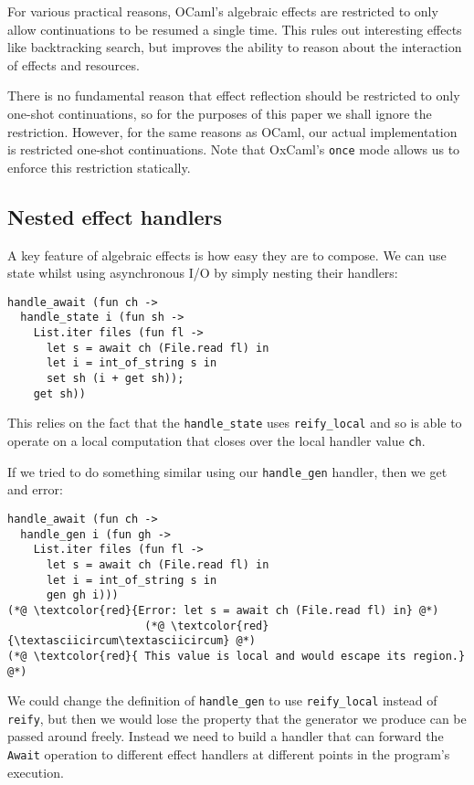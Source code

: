 \documentclass[acmsmall, screen, nonacm]{acmart}
\theoremstyle{definition}
\begin{document}
For various practical reasons, OCaml's algebraic effects are restricted
to only allow continuations to be resumed a single time. This rules out
interesting effects like backtracking search, but improves the ability
to reason about the interaction of effects and resources.

There is no fundamental reason that effect reflection should be
restricted to only one-shot continuations, so for the purposes of this
paper we shall ignore the restriction. However, for the same reasons as
OCaml, our actual implementation is restricted one-shot
continuations. Note that OxCaml's \lstinline[style=ocaml]{once}
mode\cite{lorenzen2024oxidizing} allows us to enforce this restriction
statically.

\subsection{Nested effect handlers}

A key feature of algebraic effects is how easy they are to compose. We
can use state whilst using asynchronous I/O by simply nesting their
handlers:
\begin{lstlisting}[style=ocaml]
handle_await (fun ch ->
  handle_state i (fun sh ->
    List.iter files (fun fl ->
      let s = await ch (File.read fl) in
      let i = int_of_string s in
      set sh (i + get sh));
    get sh))
\end{lstlisting}

This relies on the fact that the \lstinline[style=ocaml]{handle_state}
uses \lstinline[style=ocaml]{reify_local} and so is able to operate on a
local computation that closes over the local handler value
\lstinline[style=ocaml]{ch}.

If we tried to do something similar using our
\lstinline[style=ocaml]{handle_gen} handler, then we get and error:
\begin{lstlisting}[style=ocaml]
handle_await (fun ch ->
  handle_gen i (fun gh ->
    List.iter files (fun fl ->
      let s = await ch (File.read fl) in
      let i = int_of_string s in
      gen gh i)))
(*@ \textcolor{red}{Error: let s = await ch (File.read fl) in} @*)
                     (*@ \textcolor{red}{\textasciicircum\textasciicircum} @*)
(*@ \textcolor{red}{ This value is local and would escape its region.} @*)
\end{lstlisting}

We could change the definition of \lstinline[style=ocaml]{handle_gen} to
use \lstinline[style=ocaml]{reify_local} instead of
\lstinline[style=ocaml]{reify}, but then we would lose the property that
the generator we produce can be passed around freely. Instead we need to
build a handler that can forward the \lstinline[style=ocaml]{Await}
operation to different effect handlers at different points in the
program's execution.
\end{document}
